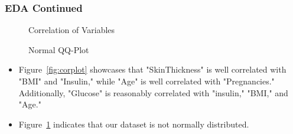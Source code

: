 \documentclass{beamer}
\begin{document}
\begin{frame}
    \frametitle{EDA Continued}
	\begin{figure}[h!]
		\centering
		\begin{minipage}{0.48\textwidth}
			\caption{Correlation of Variables} 
			\label{fig:corplot}
		\end{minipage}
		\hfill %
		\centering
		\begin{minipage}{0.48\textwidth}
			\centering
			\caption{Normal QQ-Plot} 
			\label{fig:qqplot}
		\end{minipage}
	\end{figure}
	\vspace{-0.2cm} %
    \begin{itemize}
        \item Figure~\ref{fig:corplot} showcases that "SkinThickness" is well correlated with "BMI" and "Insulin," while "Age" is well correlated with "Pregnancies." Additionally, "Glucose" is reasonably correlated with "insulin," "BMI," and "Age."
        \item Figure~\ref{fig:qqplot} indicates that our dataset is not normally distributed.
    \end{itemize}
    

\end{frame}
\end{document}
